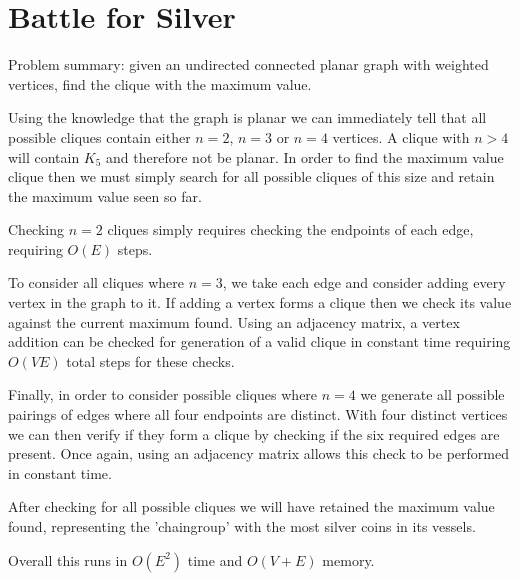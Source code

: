 \section{Battle for Silver}

Problem summary: given an undirected connected planar graph with weighted vertices, 
find the clique with the maximum value.

Using the knowledge that the graph is planar we can immediately tell that all
possible cliques contain either $n=2$, $n=3$ or $n=4$ vertices. A clique with
$n>4$ will contain $K_5$ and therefore not be planar. In order to find the 
maximum value clique then we must simply search for all possible cliques of 
this size and retain the maximum value seen so far. 

Checking $n=2$ cliques simply requires checking the endpoints of each edge, 
requiring $O(E)$ steps. 

To consider all cliques where $n=3$, we take each edge and consider adding 
every vertex in the graph to it. If adding a vertex forms a clique then we 
check its value against the current maximum found. Using an adjacency matrix, 
a vertex addition can be checked for generation of a valid clique in constant 
time requiring $O(VE)$ total steps for these checks.

Finally, in order to consider possible cliques where $n=4$ we generate all
possible pairings of edges where all four endpoints are distinct. With four
distinct vertices we can then verify if they form a clique by checking if
the six required edges are present. Once again, using an adjacency matrix
allows this check to be performed in constant time. 

After checking for all possible cliques we will have retained the maximum
value found, representing the 'chaingroup' with the most silver coins in
its vessels.

Overall this runs in $O(E^2)$ time and $O(V + E)$ memory.
